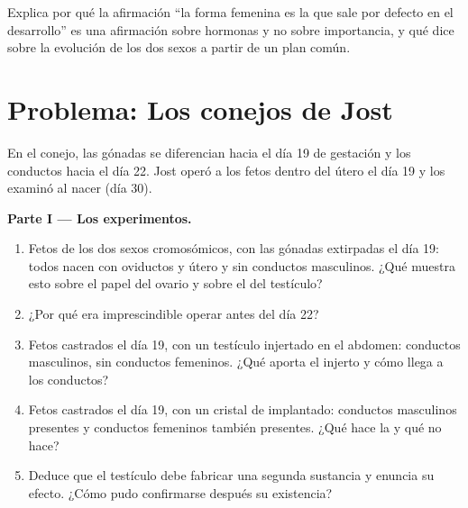 \begin{exercise}[$\star\star\star$]\label{exo:g11:becoming-male-female:15}
Explica por qué la afirmación ``la forma femenina es la que sale por
defecto en el desarrollo'' es una afirmación sobre hormonas y no sobre
importancia, y qué dice sobre la evolución de los dos sexos a partir de
un plan común.
\end{exercise}

\section{Problema: Los conejos de Jost}

\begin{problem}
\label{pb:g11:becoming-male-female:1}
En el conejo, las gónadas se diferencian hacia el día 19 de gestación y
los conductos hacia el día 22. Jost operó a los fetos dentro del útero
el día 19 y los examinó al nacer (día 30).

\medskip
\noindent\textbf{Parte I --- Los experimentos.}
\begin{enumerate}
  \item Fetos de los dos sexos cromosómicos, con las gónadas extirpadas
        el día 19: todos nacen con oviductos y útero y sin conductos
        masculinos. ¿Qué muestra esto sobre el papel del ovario y sobre
        el del testículo?
  \item ¿Por qué era imprescindible operar antes del día 22?
  \item Fetos castrados el día 19, con un testículo injertado en el
        abdomen: conductos masculinos, sin conductos femeninos. ¿Qué
        aporta el injerto y cómo llega a los conductos?
  \item Fetos castrados el día 19, con un cristal de 
        implantado: conductos masculinos presentes y conductos
        femeninos también presentes. ¿Qué hace la  y qué no
        hace?
  \item Deduce que el testículo debe fabricar una segunda sustancia y
        enuncia su efecto. ¿Cómo pudo confirmarse después su
        existencia?
\end{enumerate}


\end{problem}
